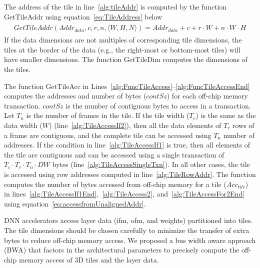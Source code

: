 The address of the tile in line~\ref{alg:tileAddr} is computed by the function GetTileAddr using equation~\ref{eq:TileAddress} below
\begin{align}\label{eq:TileAddress}
	\begin{split}
		GetTileAddr(Addr_{data},c,r,n,\langle W,H,N\rangle){=}Addr_{data} + c + r\cdot W + n\cdot W\cdot H
	\end{split}
\end{align}
If the data dimensions are not multiples of corresponding tile dimensions, the tiles at the border of the data (e.g., the right-most or bottom-most tiles) will have smaller dimensions. The function GetTileDim computes the dimensions of the tiles.

The function GetTileAcc in Lines~\ref{alg:FuncTileAccess}--\ref{alg:FuncTileAccessEnd} computes the addresses and number of bytes ($contSz$) for each off-chip memory transaction. $contSz$ is the number of contiguous bytes to access in a transaction. Let $T_n$ is the number of frames in the tile. If the tile width ($T_c$) is the same as the data width ($W$) (line~\ref{alg:TileAccessIf2}), then all the data elements of $T_r$ rows of a frame are contiguous, and the complete tile can be accessed using $T_n$ number of addresses. If the condition in line~\ref{alg:TileAccessIf1} is true, then all elements of the tile are contiguous and can be accessed using a single transaction of $T_c\cdot T_r\cdot T_n\cdot DW$ bytes (line~\ref{alg:TileAccessSingleTxn}). In all other cases, the tile is accessed using row addresses computed in line~\ref{alg:TileRowAddr}. The function computes the number of bytes accessed from off-chip memory for a tile ($Acc_{tile}$) in lines~\ref{alg:TileAccessIf1End},~\ref{alg:TileAccess2}, and~\ref{alg:TileAccessFor2End} using equation~\ref{eq:accessfromUnalignedAddr}. 

DNN accelerators access layer data (ifm, ofm, and weights) partitioned into tiles. The tile dimensions should be chosen carefully to minimize the transfer of extra bytes to reduce off-chip memory access. We proposed a bus width aware approach (BWA) that factors in the architectural parameters to precisely compute the off-chip memory access of 3D tiles and the layer data.

